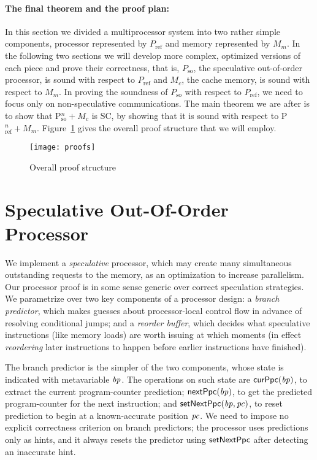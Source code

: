 \paragraph{The final theorem and the proof plan:} 
In this section we divided a multiprocessor system into two rather simple
components, processor represented by $P_\text{ref}$ and memory represented by
$M_m$. In the following two sections we will develop more complex, optimized
versions of each piece and prove their correctness, that is, $P_\text{so}$, the
speculative out-of-order processor, is sound with respect to $P_\text{ref}$ and
$M_c$, the cache memory, is sound with respect to $M_m$. In proving the
soundness of $P_\text{so}$ with respect to $P_\text{ref}$, we need to focus
only on non-speculative communications. The main theorem we are after is to
show that P$^n_\text{so}+ M_c$ is SC, by showing that it is sound with respect
to P$^n_\text{ref}+ M_m$. Figure~\ref{proofs} gives the overall proof structure
that we will employ.


\begin{figure}
\texttt{[image: proofs]}
\caption{Overall proof structure}
\label{proofs}
\end{figure}


\section{Speculative Out-Of-Order Processor}\label{sec:ooo}

We implement a \emph{speculative} processor, which may create many
simultaneous outstanding requests to the memory, as an optimization to
increase parallelism.  Our processor proof is in some sense generic
over correct speculation strategies.  We parametrize over two key
components of a processor design: a \emph{branch predictor}, which
makes guesses about processor-local control flow in advance of
resolving conditional jumps; and a
\emph{reorder buffer}, which decides what speculative instructions (like memory loads)
are worth issuing at which moments (in effect \emph{reordering} later
instructions to happen before earlier instructions have finished).

The branch predictor is the simpler of the two components, whose state
is indicated with metavariable $\mathit{bp}$.
The operations on such state are $\mathsf{curPpc}(\mathit{bp})$, to extract the
current program-counter prediction; $\mathsf{nextPpc}(\mathit{bp})$, to get the predicted
program-counter for the next instruction; and $\mathsf{setNextPpc}(\mathit{bp}, \mathit{pc})$,
to reset prediction to begin at a known-accurate position $\mathit{pc}$. We need to impose no explicit correctness criterion on
branch predictors; the processor uses predictions only as hints, and
it always resets the predictor using $\mathsf{setNextPpc}$ after detecting an
inaccurate hint.

